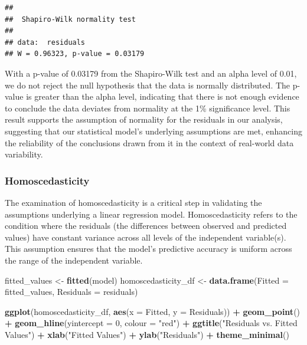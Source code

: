 \documentclass[
]{article}
\newenvironment{Shaded}{\begin{snugshade}}{\end{snugshade}}
\newcommand{\AttributeTok}[1]{\textcolor[rgb]{0.13,0.29,0.53}{#1}}
\newcommand{\DecValTok}[1]{\textcolor[rgb]{0.00,0.00,0.81}{#1}}
\newcommand{\FunctionTok}[1]{\textcolor[rgb]{0.13,0.29,0.53}{\textbf{#1}}}
\newcommand{\NormalTok}[1]{#1}
\newcommand{\OtherTok}[1]{\textcolor[rgb]{0.56,0.35,0.01}{#1}}
\newcommand{\SpecialCharTok}[1]{\textcolor[rgb]{0.81,0.36,0.00}{\textbf{#1}}}
\newcommand{\StringTok}[1]{\textcolor[rgb]{0.31,0.60,0.02}{#1}}
\begin{document}
\begin{verbatim}
## 
##  Shapiro-Wilk normality test
## 
## data:  residuals
## W = 0.96323, p-value = 0.03179
\end{verbatim}

With a p-value of 0.03179 from the Shapiro-Wilk test and an alpha level
of 0.01, we do not reject the null hypothesis that the data is normally
distributed. The p-value is greater than the alpha level, indicating
that there is not enough evidence to conclude the data deviates from
normality at the 1\% significance level. This result supports the
assumption of normality for the residuals in our analysis, suggesting
that our statistical model's underlying assumptions are met, enhancing
the reliability of the conclusions drawn from it in the context of
real-world data variability.

\subsubsection{Homoscedasticity}\label{homoscedasticity-1}

The examination of homoscedasticity is a critical step in validating the
assumptions underlying a linear regression model. Homoscedasticity
refers to the condition where the residuals (the differences between
observed and predicted values) have constant variance across all levels
of the independent variable(s). This assumption ensures that the model's
predictive accuracy is uniform across the range of the independent
variable.

\begin{Shaded}
\begin{Highlighting}[]
\NormalTok{fitted\_values }\OtherTok{\textless{}{-}} \FunctionTok{fitted}\NormalTok{(model)}
\NormalTok{homoscedasticity\_df }\OtherTok{\textless{}{-}} \FunctionTok{data.frame}\NormalTok{(}\AttributeTok{Fitted =}\NormalTok{ fitted\_values, }\AttributeTok{Residuals =}\NormalTok{ residuals)}

\FunctionTok{ggplot}\NormalTok{(homoscedasticity\_df, }\FunctionTok{aes}\NormalTok{(}\AttributeTok{x =}\NormalTok{ Fitted, }\AttributeTok{y =}\NormalTok{ Residuals)) }\SpecialCharTok{+}
    \FunctionTok{geom\_point}\NormalTok{() }\SpecialCharTok{+} \FunctionTok{geom\_hline}\NormalTok{(}\AttributeTok{yintercept =} \DecValTok{0}\NormalTok{, }\AttributeTok{colour =} \StringTok{"red"}\NormalTok{) }\SpecialCharTok{+}
    \FunctionTok{ggtitle}\NormalTok{(}\StringTok{"Residuals vs. Fitted Values"}\NormalTok{) }\SpecialCharTok{+} \FunctionTok{xlab}\NormalTok{(}\StringTok{"Fitted Values"}\NormalTok{) }\SpecialCharTok{+}
    \FunctionTok{ylab}\NormalTok{(}\StringTok{"Residuals"}\NormalTok{) }\SpecialCharTok{+} \FunctionTok{theme\_minimal}\NormalTok{()}
\end{Highlighting}
\end{Shaded}
\end{document}
